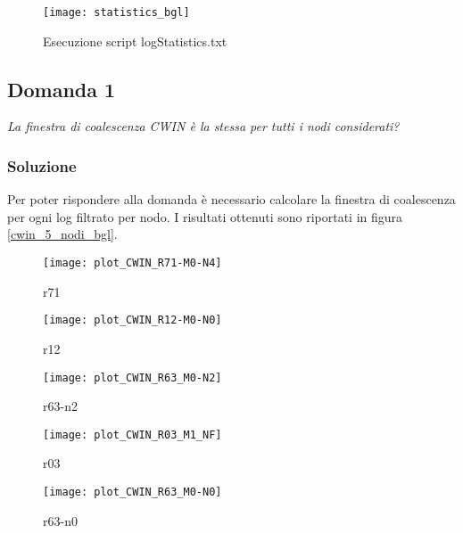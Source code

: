 \begin{figure}[!htbp]
  \centering
  \texttt{[image: statistics\_bgl]}
  \caption{Esecuzione script logStatistics.txt}
  \label{statistics_bgl}
\end{figure}

\clearpage

\subsection{Domanda 1}
\textit{La finestra di coalescenza CWIN è la stessa per tutti i nodi considerati?}

\subsubsection*{Soluzione}
Per poter rispondere alla domanda è necessario calcolare la finestra di coalescenza
per ogni log filtrato per nodo.
I risultati ottenuti sono riportati in figura \ref{cwin_5_nodi_bgl}.\\

\begin{minipage}{\linewidth}
  \centering
  \begin{minipage}{0.49\linewidth}
    \begin{figure}[H]
      \texttt{[image: plot\_CWIN\_R71-M0-N4]}
      \caption*{r71}
    \end{figure}
  \end{minipage}
  \begin{minipage}{0.49\linewidth}
    \begin{figure}[H]
      \texttt{[image: plot\_CWIN\_R12-M0-N0]}
      \caption*{r12}
    \end{figure}
  \end{minipage}
  \begin{minipage}{0.49\linewidth}
    \begin{figure}[H]
      \texttt{[image: plot\_CWIN\_R63\_M0-N2]}
      \caption*{r63-n2}
    \end{figure}
  \end{minipage}
  \begin{minipage}{0.49\linewidth}
    \begin{figure}[H]
      \centering
      \texttt{[image: plot\_CWIN\_R03\_M1\_NF]}
      \caption*{r03}
    \end{figure}
  \end{minipage}
  \begin{minipage}{0.49\linewidth}
    \hspace{0.25\linewidth}
    \begin{figure}[H]
      \texttt{[image: plot\_CWIN\_R63\_M0-N0]}
      \caption*{r63-n0}
    \end{figure}
  \end{minipage}
\end{minipage}
\label{cwin_5_nodi_bgl}

